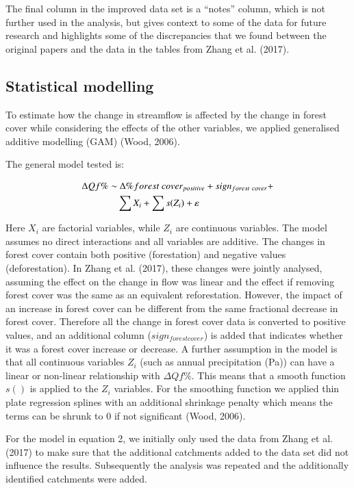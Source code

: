 \documentclass[]{elsarticle} %
\begin{document}
The final column in the improved data set is a ``notes'' column, which is not further used in the analysis, but gives context to some of the data for future research and highlights some of the discrepancies that we found between the original papers and the data in the tables from Zhang et al. (2017).

\hypertarget{statistical-modelling}{%
\subsection{Statistical modelling}\label{statistical-modelling}}

To estimate how the change in streamflow is affected by the change in forest cover while considering the effects of the other variables, we applied generalised additive modelling (GAM) (Wood, 2006).

The general model tested is:

\begin{align}
\Delta Qf \% \sim &~ \Delta \% forest~cover_{positive} + sign_{forest~cover} + \notag \\ 
& \sum{X_i} + \sum{s(Z_i)} + \varepsilon \label{eq:eq2}
\end{align}

Here \(X_i\) are factorial variables, while \(Z_i\) are continuous variables. The model assumes no direct interactions and all variables are additive. The changes in forest cover contain both positive (forestation) and negative values (deforestation). In Zhang et al. (2017), these changes were jointly analysed, assuming the effect on the change in flow was linear and the effect if removing forest cover was the same as an equivalent reforestation. However, the impact of an increase in forest cover can be different from the same fractional decrease in forest cover. Therefore all the change in forest cover data is converted to positive values, and an additional column (\(sign_{forest cover}\)) is added that indicates whether it was a forest cover increase or decrease.
A further assumption in the model is that all continuous variables \(Z_i\) (such as annual precipitation (Pa)) can have a linear or non-linear relationship with \(\Delta Qf \%\). This means that a smooth function \(s()\) is applied to the \(Z_i\) variables. For the smoothing function we applied thin plate regression splines with an additional shrinkage penalty which means the terms can be shrunk to 0 if not significant (Wood, 2006).

For the model in equation 2, we initially only used the data from Zhang et al. (2017) to make sure that the additional catchments added to the data set did not influence the results. Subsequently the analysis was repeated and the additionally identified catchments were added.
\end{document}
